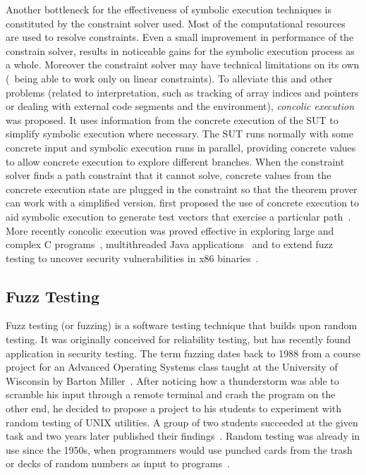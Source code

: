 Another bottleneck for the effectiveness of symbolic execution techniques is
constituted by the constraint solver used. Most of the computational resources
are used to resolve constraints. Even a small improvement in performance of the
constrain solver, results in noticeable gains for the symbolic execution process
as a whole. Moreover the constraint solver may have technical limitations on its
own (\eg~being able to work only on linear constraints). To alleviate this and
other problems (related to interpretation, such as tracking of array indices and
pointers or dealing with external code segments and the environment),
\emph{concolic execution} was proposed. It uses information from the concrete
execution of the \ac{SUT} to simplify symbolic execution where necessary. The
\ac{SUT} runs normally with some concrete input and symbolic execution runs in
parallel, providing concrete values to allow concrete execution to explore
different branches. When the constraint solver finds a path constraint that it
cannot solve, concrete values from the concrete execution state are plugged in
the constraint so that the theorem prover can work with a simplified version.
\citeauthor{Korel1990AutomatedST} first proposed the use of concrete execution
to aid symbolic execution to generate test vectors that exercise a particular
path~\cite{Korel1990AutomatedST}. More recently concolic execution was proved
effective in exploring large and complex C programs~\cite{Godefroid2005DARTDA,
Sen2005CUTEAC}, multithreaded Java applications~\cite{Sen2006CUTEAJ} and to
extend fuzz testing to uncover security vulnerabilities in x86
binaries~\cite{godefroid2008automated, godefroid2007random}.

\subsection{Fuzz Testing}
Fuzz testing (or fuzzing) is a software testing technique that builds upon random
testing. It was originally conceived for reliability testing, but has recently
found application in security testing. The term fuzzing dates back to 1988 from
a course project for an Advanced Operating Systems class taught at the
University of Wisconsin by Barton Miller~\cite{takanen2008fuzzing}. After
noticing how a thunderstorm was able to scramble his input through a remote
terminal and crash the program on the other end, he decided to propose a project
to his students to experiment with random testing of UNIX utilities. A group of
two students succeeded at the given task and two years later published their
findings~\cite{miller1990empirical}. Random testing was already in use since the
1950s, when programmers would use punched cards from the trash or decks of
random numbers as input to programs~\cite{weinberg2008}.

